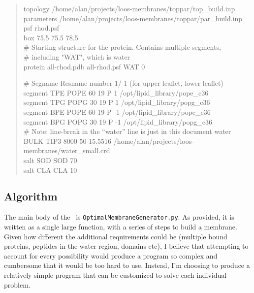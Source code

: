 \documentclass[12pt]{article}
\begin{document}
\begin{quote}
topology /home/alan/projects/loos-membranes/toppar/top\_build.inp \\
parameters /home/alan/projects/loos-membranes/toppar/par\_build.inp \\
psf      rhod.psf \\
box      75.5  75.5  78.5 \\

\# Starting structure for the protein.  Contains multiple segments, \\
\# including "WAT", which is water \\
protein  all-rhod.pdb all-rhod.psf WAT 0

\# Segname  Resname number 1/-1 (for upper leaflet, lower leaflet) \\
segment TPE   POPE     60    19    P 1      /opt/lipid\_library/pope\_c36 \\
segment TPG   POPG     30    19    P 1      /opt/lipid\_library/popg\_c36 \\
segment BPE   POPE     60    19   P  -1     /opt/lipid\_library/pope\_c36 \\
segment BPG   POPG     30    19   P  -1     /opt/lipid\_library/popg\_c36 \\

\# Note: line-break in the ``water'' line is just in this document
water   BULK     TIP3      8000       50      15.5516
/home/alan/projects/loos-membranes/water\_small.crd \\
salt    SOD       SOD      70 \\
salt    CLA       CLA      10 \\

\end{quote}

\subsection{Algorithm}
\label{ss:algorithm}

The main body of the \omgwtf\ is {\tt OptimalMembraneGenerator.py}.  As
provided, it is written as a single large function, with a series of steps to
build a membrane.  Given how different the additional requirements could be
(multiple bound proteins, peptides in the water region, domains
etc),  I believe that attempting to account for every possibility would
produce a program so complex and cumbersome that it would be too hard to use.
Instead, I'm choosing to produce a relatively simple program that can be
customized to solve each individual problem.
\end{document}
